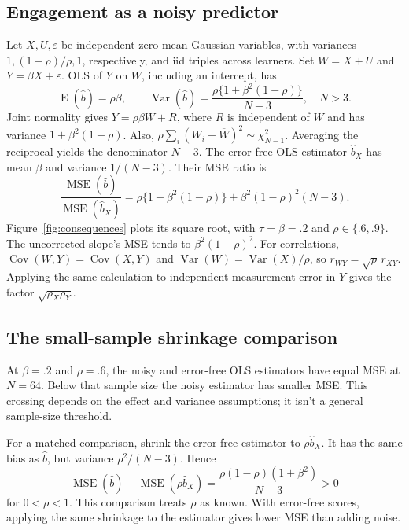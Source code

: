 \documentclass[12pt,twoside]{article}
\begin{document}
\newpage
\subsection{Engagement as a noisy predictor}

Let $X,U,\varepsilon$ be independent zero-mean Gaussian variables, with variances $1,(1-\rho)/\rho,1$, respectively, and iid triples across learners. Set $W=X+U$ and $Y=\beta X+\varepsilon$. OLS of $Y$ on $W$, including an intercept, has
\[
\operatorname{E}(\widehat b)=\rho\beta,\qquad
\operatorname{Var}(\widehat b)=\frac{\rho\{1+\beta^2(1-\rho)\}}{N-3},\quad N>3.
\]
Joint normality gives $Y=\rho\beta W+R$, where $R$ is independent of $W$ and has variance $1+\beta^2(1-\rho)$. Also, $\rho\sum_i(W_i-\overline W)^2\sim\chi^2_{N-1}$. Averaging the reciprocal yields the denominator $N-3$. The error-free OLS estimator $\widehat b_X$ has mean $\beta$ and variance $1/(N-3)$. Their MSE ratio is
\[
\frac{\operatorname{MSE}(\widehat b)}{\operatorname{MSE}(\widehat b_X)}
=\rho\{1+\beta^2(1-\rho)\}+\beta^2(1-\rho)^2(N-3).
\]
Figure~\ref{fig:consequences} plots its square root, with $\tau=\beta=.2$ and $\rho\in\{.6,.9\}$. The uncorrected slope's MSE tends to $\beta^2(1-\rho)^2$. For correlations, $\operatorname{Cov}(W,Y)=\operatorname{Cov}(X,Y)$ and $\operatorname{Var}(W)=\operatorname{Var}(X)/\rho$, so $r_{WY}=\sqrt{\rho}\,r_{XY}$. Applying the same calculation to independent measurement error in $Y$ gives the factor $\sqrt{\rho_X\rho_Y}$.

\subsection{The small-sample shrinkage comparison}
\label{app:shrinkage}

At $\beta=.2$ and $\rho=.6$, the noisy and error-free OLS estimators have equal MSE at $N=64$. Below that sample size the noisy estimator has smaller MSE. This crossing depends on the effect and variance assumptions; it isn't a general sample-size threshold.

For a matched comparison, shrink the error-free estimator to $\rho\widehat b_X$. It has the same bias as $\widehat b$, but variance $\rho^2/(N-3)$. Hence
\[
\operatorname{MSE}(\widehat b)-\operatorname{MSE}(\rho\widehat b_X)
=\frac{\rho(1-\rho)(1+\beta^2)}{N-3}>0
\]
for $0<\rho<1$. This comparison treats $\rho$ as known. With error-free scores, applying the same shrinkage to the estimator gives lower MSE than adding noise.

\clearpage
\printbibliography
\end{document}
